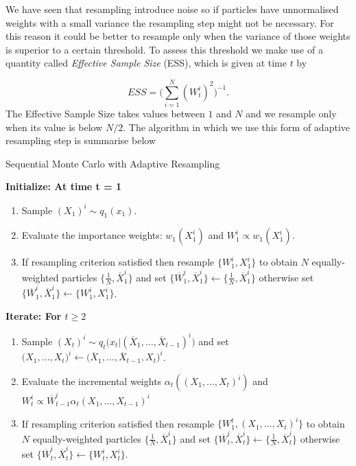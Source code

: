 \documentclass[11pt,a4paper]{article}
\begin{document}
We have seen that resampling introduce noise so if particles have unnormalised weights with a small variance the resampling step might not be necessary. For this reason it could be better to resample only when the variance of those weights is superior to a certain threshold. To assess this threshold we make use of a quantity called \textit{Effective Sample Size} (ESS), which is given at time $t$ by

\begin{equation*}
    ESS = \Bigg( \sum_{i=1}^N (W_t^i)^2\Bigg)^{-1}.
\end{equation*}
The Effective Sample Size takes values between $1$ and $N$ and we resample only when its value is below $N/2$. The algorithm in which we use this form of adaptive resampling step is summarise below 

\begin{algorithm}[H]
\caption{Sequential Monte Carlo with Adaptive Resampling}\label{Adaptive}
    \begin{algorithmic}
        \State  \bf{Initialize:} \normalfont At time t = 1
            \begin{enumerate}
	            \item Sample $(X_{1})^i \sim q_1(x_1)$.
	            \item Evaluate the importance weights: $w_1(X_1^i)$ and $W^i_1 \propto w_1(X_1^i)$.
	            \item If resampling criterion satisfied then resample $\{ W_1^i, X_1^i \}$ to obtain $N$ equally-weighted particles $\big\{ \frac{1}{N}, \overline{X}_1^i \big\}$ and set $\big\{ \overline{W}_1^i, \overline{X}_1^i \big\} \leftarrow \big\{ \frac{1}{N}, \overline{X}_1^i \big\}$ otherwise set $\big\{ \overline{W}_1^i, \overline{X}_1^i \big\} \leftarrow \big\{ W^i_1, X_1^i \big\}$.
            \end{enumerate}
        \State  \bf{Iterate:} \normalfont For $t \geq 2$
            \begin{enumerate}
	            \item Sample $(X_{t})^i \sim q_t \big(x_t | (\overline{X}_1, \dots, \overline{X}_{t-1})^i \big)$ and set $\big(X_{1}, \dots, X_{t} \big)^i \leftarrow \big(\overline{X}_1, \dots, \overline{X}_{t-1}, X_t \big)^i$.
	            \item Evaluate the incremental weights $\alpha_t((X_1, \dots, X_t)^i)$ and $W^i_t \propto \overline{W}^i_{t-1} \alpha_t(X_1, \dots, X_{t-1})^i$
	            \item If resampling criterion satisfied then resample $\{ W_1^t, (X_1, \dots, X_t)^i \}$ to obtain $N$ equally-weighted particles $\big\{ \frac{1}{N}, \overline{X}_1^i \big\}$ and set $\big\{ \overline{W}_t^i, \overline{X}_t^i \big\} \leftarrow \big\{ \frac{1}{N}, \overline{X}_t^i \big\}$ otherwise set $\big\{ \overline{W}_t^i, \overline{X}_t^i \big\} \leftarrow \big\{ W^i_t, X_t^i \big\}$.
	        \end{enumerate}
    \end{algorithmic}
\end{algorithm}
\end{document}
